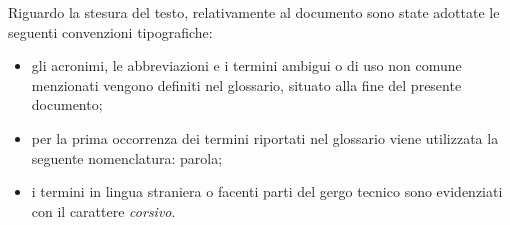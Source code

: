 Riguardo la stesura del testo, relativamente al documento sono state adottate le seguenti convenzioni tipografiche:
\begin{itemize}
	\item gli acronimi, le abbreviazioni e i termini ambigui o di uso non comune menzionati vengono definiti nel glossario, situato alla fine del presente documento;
	\item per la prima occorrenza dei termini riportati nel glossario viene utilizzata la seguente nomenclatura: parola\glsfirstoccur;
	\item i termini in lingua straniera o facenti parti del gergo tecnico sono evidenziati con il carattere \emph{corsivo}.
\end{itemize}
